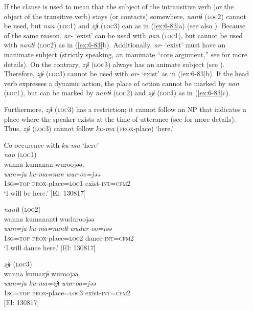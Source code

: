If the clause is used to mean that the subject of the intransitive verb (or the object of the transitive verb) stays (or contacts) somewhere, \textit{nantɨ} (\textsc{loc2}) cannot be used, but \textit{nan} (\textsc{loc1}) and \textit{zjɨ} (\textsc{loc3}) can as in (\ref{ex:6-83}a) (see also ). Because of the same reason, \textit{ar-} ‘exist’ can be used with \textit{nan} (\textsc{loc1}), but cannot be used with \textit{nantɨ} (\textsc{loc2}) as in (\ref{ex:6-83}b). Additionally, \textit{ar-} ‘exist’ must have an inanimate subject (strictly speaking, an inanimate “core argument,” see  for more details). On the contrary, \textit{zjɨ} (\textsc{loc3}) always has an animate subject (see ). Therefore, \textit{zjɨ} (\textsc{loc3}) cannot be used with \textit{ar-} ‘exist’ as in (\ref{ex:6-83}b). If the head verb expresses a dynamic action, the place of action cannot be marked by \textit{nan} (\textsc{loc1}), but can be marked by \textit{nantɨ} (\textsc{loc2}) and \textit{zjɨ} (\textsc{loc3}) as in (\ref{ex:6-83}c).

  Furthermore, \textit{zjɨ} (\textsc{loc3}) has a restriction; it cannot follow an NP that indicates a place where the speaker exists at the time of utterance (see  for more details). Thus, \textit{zjɨ} (\textsc{loc3}) cannot follow \textit{ku-ma} (\textsc{prox}-place) ‘here.’

\ea\label{ex:6-84}
 Co-occurence with \textit{ku-ma} ‘here’\\

 \ea \textit{nan} (\textsc{loc1})\\
{\TM}
\glll  wanna  kumanan  wuroojəə.\\
\textit{wan=ja}  \textit{ku-ma=nan}  \textit{wur-oo=jəə}\\
1\textsc{sg}=\textsc{top}  \textsc{prox}-place=\textsc{loc1}  exist-\textsc{int}=\textsc{cfm}2\\
\glt ‘I will be here.’ [El: 130817]

\ex \textit{nantɨ} (\textsc{loc2})\\
{\TM}
\glll  wanna  kumanantɨ  wuduroojəə\\
\textit{wan=ja}  \textit{ku-ma=nantɨ}  \textit{wudur-oo=jəə}\\
1\textsc{sg}=\textsc{top}  \textsc{prox}-place=\textsc{loc2}  dance-\textsc{int}=\textsc{cfm}2\\
\glt ‘I will dance here.’ [El: 130817]

\ex \textit{zjɨ} (\textsc{loc3})\\
{\TM}
\glll  *wanna  kumazjɨ  wuroojəə.\\
\textit{wan=ja}  \textit{ku-ma=zjɨ}  \textit{wur-oo=jəə}\\
1\textsc{sg}=\textsc{top}  \textsc{prox}-place=\textsc{loc3}  exist-\textsc{int}=\textsc{cfm}2 \\
{}[El: 130817]
\z
\z


